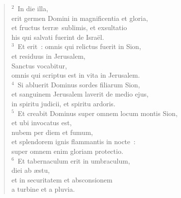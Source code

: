 \begin{verse}${}^{2}$~In die illa,\\ erit germen Domini in magnificentia et gloria,\\ et fructus terr\ae\ sublimis, et exsultatio\\ his qui salvati fuerint de Isra\"el.\\
${}^{3}$~Et erit~: omnis qui relictus fuerit in Sion,\\ et residuus in Jerusalem,\\ Sanctus vocabitur,\\ omnis qui scriptus est in vita in Jerusalem.\\
${}^{4}$~Si abluerit Dominus sordes filiarum Sion,\\ et sanguinem Jerusalem laverit de medio ejus,\\ in spiritu judicii, et spiritu ardoris.\\
${}^{5}$~Et creabit Dominus super omnem locum montis Sion,\\ et ubi invocatus est,\\ nubem per diem et fumum,\\ et splendorem ignis flammantis in nocte~:\\ super omnem enim gloriam protectio.\\
${}^{6}$~Et tabernaculum erit in umbraculum,\\ diei ab \ae stu,\\ et in securitatem et absconsionem\\ a turbine et a pluvia.\end{verse}


